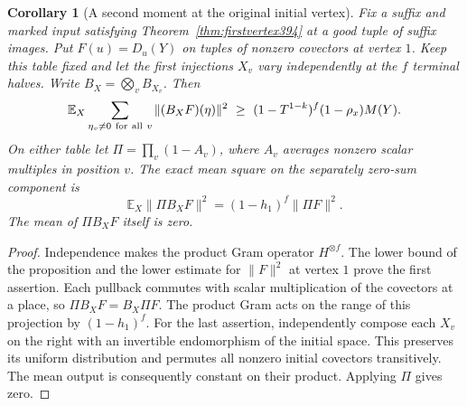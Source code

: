 \documentclass[a4paper,11pt]{article}
\newtheorem{corollary}[proposition]{Corollary}
\theoremstyle{definition}
\theoremstyle{remark}
\numberwithin{equation}{section}
\begin{document}
\begin{corollary}[A second moment at the original initial vertex]
\label{cor:firstaverage395}
Fix a suffix and marked input satisfying
Theorem~\ref{thm:firstvertex394} at a good tuple of suffix
images. Put \(F(u)=D_u(Y)\) on tuples of nonzero covectors at
vertex \(1\). Keep this table fixed and let the first injections
\(X_v\) vary independently at the \(f\) terminal halves.
Write \(B_X=\bigotimes_v B_{X_v}\). Then
\[
 \mathbb E_X\sum_{\eta_v\ne0\ {\rm for\ all}\ v}
       \|(B_XF)(\eta)\|^2
   \ \ge\ (1-T^{1-k})^f(1-\rho_x)M(Y).
\]
On either table let \(\Pi=\prod_v(1-A_v)\), where \(A_v\)
averages nonzero scalar multiples in position \(v\). The exact
mean square on the separately zero-sum component is
\[
            \mathbb E_X\|\Pi B_XF\|^2
                     =(1-h_1)^f\|\Pi F\|^2 .
\]
The mean of \(\Pi B_XF\) itself is zero.
\end{corollary}
\begin{proof}
Independence makes the product Gram operator \(H^{\otimes f}\).
The lower bound of the proposition and the lower estimate
for \(\|F\|^2\) at vertex \(1\) prove the first assertion.
Each pullback commutes with scalar multiplication of the
covectors at a place, so \(\Pi B_XF=B_X\Pi F\).
The product Gram acts on the range of this projection by
\((1-h_1)^f\). For the last assertion, independently compose
each \(X_v\) on the right with an invertible endomorphism of
the initial space. This preserves its uniform distribution
and permutes all nonzero initial covectors transitively.
The mean output is consequently constant on their product.
Applying \(\Pi\) gives zero.
\end{proof}
\end{document}
